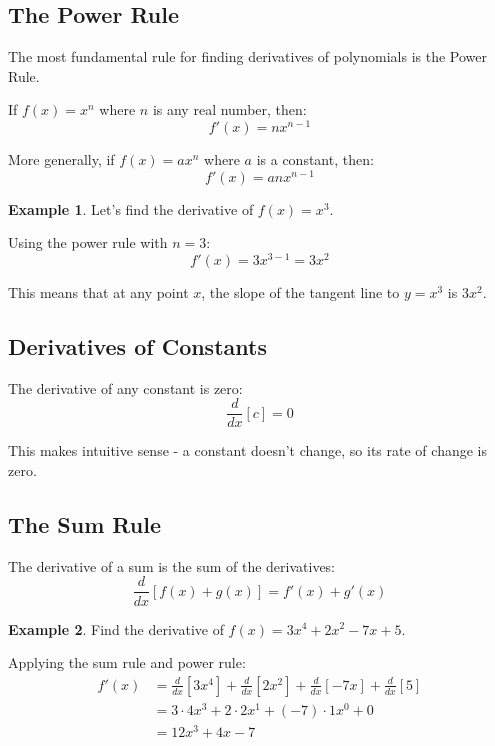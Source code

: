 \documentclass[12pt,a4paper]{book}
\theoremstyle{definition}
\newtheorem{example}{Example}[chapter]
\begin{document}
\subsection{The Power Rule}

The most fundamental rule for finding derivatives of polynomials is the Power Rule.

\begin{keyformula}
If $f(x) = x^n$ where $n$ is any real number, then:
$$f'(x) = nx^{n-1}$$

More generally, if $f(x) = ax^n$ where $a$ is a constant, then:
$$f'(x) = anx^{n-1}$$
\end{keyformula}

\begin{example}
Let's find the derivative of $f(x) = x^3$.

Using the power rule with $n = 3$:
$$f'(x) = 3x^{3-1} = 3x^2$$

This means that at any point $x$, the slope of the tangent line to $y = x^3$ is $3x^2$.
\end{example}

\subsection{Derivatives of Constants}

\begin{keyformula}
The derivative of any constant is zero:
$$\frac{d}{dx}[c] = 0$$

This makes intuitive sense - a constant doesn't change, so its rate of change is zero.
\end{keyformula}

\subsection{The Sum Rule}

\begin{keyformula}
The derivative of a sum is the sum of the derivatives:
$$\frac{d}{dx}[f(x) + g(x)] = f'(x) + g'(x)$$
\end{keyformula}

\begin{example}
Find the derivative of $f(x) = 3x^4 + 2x^2 - 7x + 5$.

Applying the sum rule and power rule:
\begin{align}
f'(x) &= \frac{d}{dx}[3x^4] + \frac{d}{dx}[2x^2] + \frac{d}{dx}[-7x] + \frac{d}{dx}[5]\\
&= 3 \cdot 4x^3 + 2 \cdot 2x^1 + (-7) \cdot 1x^0 + 0\\
&= 12x^3 + 4x - 7
\end{align}
\end{example}
\end{document}
